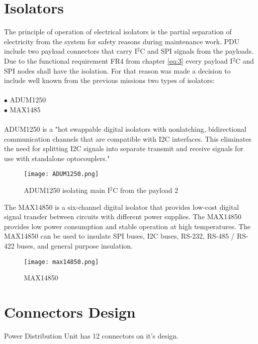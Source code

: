  \section{Isolators}
 
The principle of operation of electrical isolators is the partial separation of electricity from the system for safety reasons during maintenance work. PDU include two payload connectors that carry I$^2$C and SPI signals from the payloads. Due to the functional requirement FR4 from chapter \ref{eq:3} every payload I$^2$C and SPI nodes shall have the isolation. For that reason was made a decision to include well known from the previous missions two types of isolators:\\ \\

$\bullet$ ADUM1250\\
$\bullet$ MAX1485\\ \\

ADUM1250 \cite{30} is a "hot swappable digital isolators with nonlatching, bidirectional communication channels that are compatible with I2C interfaces. This eliminates the need for splitting I2C signals into separate transmit and receive signals for use with standalone optocouplers."

 \begin{figure}[h]
 	\centering
 	\texttt{[image: ADUM1250.png]}
 	\caption{ADUM1250 isolating main I$^2$C from the payload 2 }
 	\label{fig: adum}
 \end{figure} 

\cite{31} The MAX14850 is a six-channel digital isolator that provides low-cost digital signal transfer between circuits with different power supplies. The MAX14850 provides low power consumption and stable operation at high temperatures. The MAX14850 can be used to insulate SPI buses, I2C buses, RS-232, RS-485 / RS-422 buses, and general purpose insulation.

\begin{figure}[h]
	\centering
	\texttt{[image: max14850.png]}
	\caption{MAX14850}
	\label{fig: adum}
\end{figure} 

\section{Connectors Design}

Power Distribution Unit has 12 connectors on it's design. \\

